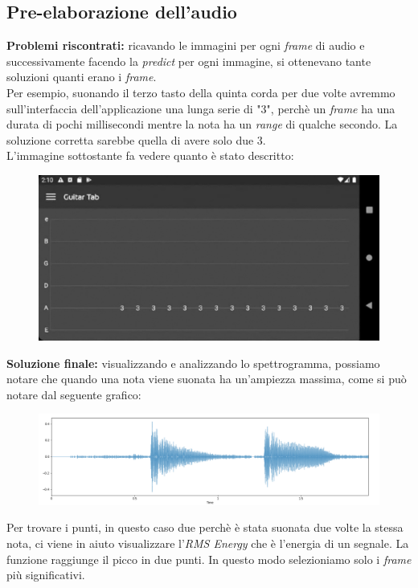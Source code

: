 \subsection{Pre-elaborazione dell'audio}
\textbf{Problemi riscontrati:} ricavando le immagini per ogni \textit{frame} di audio e successivamente facendo la \textit{predict} per ogni immagine, si ottenevano tante soluzioni quanti erano i \textit{frame}.\\ Per esempio, suonando il terzo tasto della quinta corda per due volte avremmo sull'interfaccia dell'applicazione una lunga serie di "3", perchè un \textit{frame} ha una durata di pochi millisecondi mentre la nota ha un \textit{range} di qualche secondo. La soluzione corretta sarebbe quella di avere solo due 3. \\
\newline
L'immagine sottostante fa vedere quanto è stato descritto:
\begin{figure}[H]
	\centering
	\includegraphics[scale=0.28]{./images/img25.png}
\end{figure}
%
\textbf{Soluzione finale:} visualizzando e analizzando lo spettrogramma, possiamo notare che quando una nota viene suonata ha un'ampiezza massima, come si può notare dal seguente grafico:
\begin{figure}[H]
	\centering
	\includegraphics[scale=0.35]{./images/img26.png}
\end{figure}
Per trovare i punti, in questo caso due perchè è stata suonata due volte la stessa nota, ci viene in aiuto visualizzare l'\textit{RMS Energy} che è l'energia di un segnale. La funzione raggiunge il picco in due punti. In questo modo selezioniamo solo i \textit{frame} più significativi.
